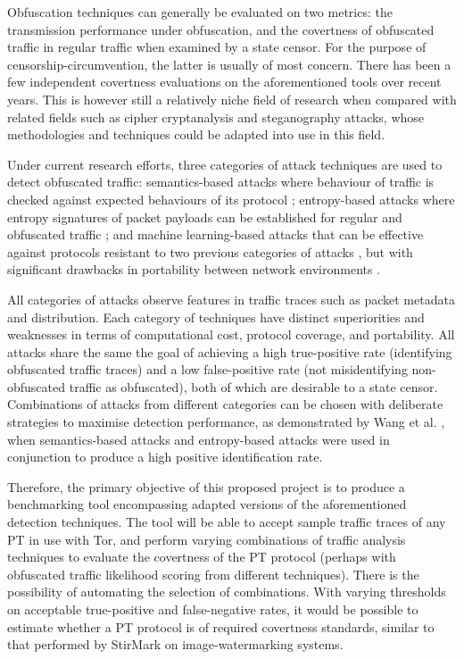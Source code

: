 \documentclass[11pt]{article}
\begin{document}
Obfuscation techniques can generally be evaluated on two metrics: the transmission performance under obfuscation, and the covertness of obfuscated traffic in regular traffic when examined by a state censor. For the purpose of censorship-circumvention, the latter is usually of most concern. There has been a few independent covertness evaluations on the aforementioned tools \cite{tan2015towards} \cite{houmansadr2013parrot} \cite{wang2015seeing} over recent years. This is however still a relatively niche field of research when compared with related fields such as cipher cryptanalysis and steganography attacks, whose methodologies and techniques could be adapted into use in this field.

Under current research efforts, three categories of attack techniques are used to detect obfuscated traffic: semantics-based attacks where behaviour of traffic is checked against expected behaviours of its protocol \cite[Sec. VIII]{houmansadr2013parrot} \cite[Sec. 4]{wang2015seeing}; entropy-based attacks where entropy signatures of packet payloads can be established for regular and obfuscated traffic \cite{tan2015towards} \cite[Sec. 5]{wang2015seeing}; and machine learning-based attacks that can be effective against protocols resistant to two previous categories of attacks \cite[Sec. 6]{wang2015seeing}, but with significant drawbacks in portability between network environments \cite{dixon2016network}. 

All categories of attacks observe features in traffic traces such as packet metadata and distribution. Each category of techniques have distinct superiorities and weaknesses in terms of computational cost, protocol coverage, and portability. All attacks share the same the goal of achieving a high true-positive rate (identifying obfuscated traffic traces) and a low false-positive rate (not misidentifying non-obfuscated traffic as obfuscated), both of which are desirable to a state censor. Combinations of attacks from different categories can be chosen with deliberate strategies to maximise detection performance, as demonstrated by Wang et al. \cite[Sec. 5.2]{wang2015seeing}, when semantics-based attacks and entropy-based attacks were used in conjunction to produce a high positive identification rate.

Therefore, the primary objective of this proposed project is to produce a benchmarking tool encompassing adapted versions of the aforementioned detection techniques. The tool will be able to accept sample traffic traces of any PT in use with Tor, and perform varying combinations of traffic analysis techniques to evaluate the covertness of the PT protocol (perhaps with obfuscated traffic likelihood scoring from different techniques). There is the possibility of automating the selection of combinations. With varying thresholds on acceptable true-positive and false-negative rates, it would be possible to estimate whether a PT protocol is of required covertness standards, similar to that performed by StirMark \cite{petitcolas1998attacks} on image-watermarking systems.
\end{document}
